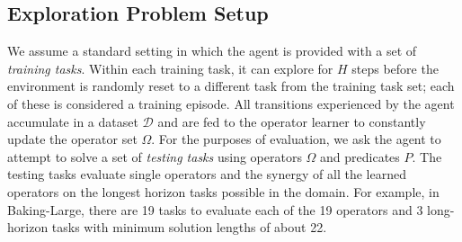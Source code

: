 \subsection{Exploration Problem Setup}
\label{subsec:exploration}
We assume a standard setting in which the agent is provided with a set of \textit{training tasks}.
Within each training task, it can explore for $H$ steps before the environment is randomly reset to a different task from the training task set; each of these is considered a training episode.
All transitions experienced by the agent accumulate in a dataset $\mathcal{D}$ and are fed to the operator learner to constantly update the operator set $\Omega$.
For the purposes of evaluation, we ask the agent to attempt to solve a set of \textit{testing tasks} using operators $\Omega$ and predicates $P$. The testing tasks evaluate single operators and the synergy of all the learned operators on the longest horizon tasks possible in the domain. For example, in Baking-Large, there are 19 tasks to evaluate each of the 19 operators and 3 long-horizon tasks with minimum solution lengths of about 22.


